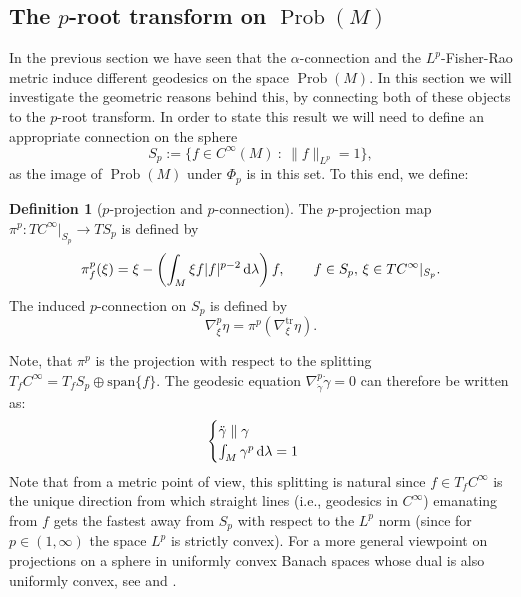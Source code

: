 \documentclass[11pt]{amsart}
\theoremstyle{definition}
\newtheorem{definition}[theorem]{Definition}
\newcommand{\dx}{\lambda}
\newcommand{\Prob}{\operatorname{Prob}(M)}
\newcommand{\ntr}{\nabla^{\text{tr}}}
\newcommand{\ud}{\textup{d}}
\begin{document}
\subsection{The $p$-root transform on $\Prob$}
In the previous section we have seen that the $\alpha$-connection and the $L^p$-Fisher-Rao metric induce different geodesics on the space $\Prob$. In this section we will investigate the geometric reasons behind this, by connecting both of these objects to the $p$-root transform.
In order to state this result we will need to define an appropriate connection on the sphere 
\[
S_p := \{ f\in C^{\infty}(M) ~:~ \|f\|_{L^p} = 1\},
\]
as the image of $\Prob$ under $\Phi_p$ is in this set.
To this end, we define:
\begin{definition}[$p$-projection and $p$-connection]
The $p$-projection map $\pi^p: TC^\infty|_{S_p} \to TS_p$ is defined by
\[
\pi^p_f(\xi) = \xi - \left(\int_M \xi f |f|^{p-2}\,\ud\dx\right)f, \qquad f\in S_p,\, \xi\in TC^\infty|_{S_p}.
\]
The induced $p$-connection on $S_p$ is defined by
\[
\nabla^p_\xi\eta = \pi^p \left( \ntr_\xi\eta\right).
\]
\end{definition}
Note, that $\pi^p$ is the projection with respect to the splitting $T_fC^\infty = T_f S_p \oplus \text{span}\{f\}$.
The geodesic equation $\nabla^p_{\dot\gamma}\dot\gamma = 0$ can therefore be written as:
\begin{equation}\label{eq:geod_nabla_p}
\begin{cases}
    \ddot\gamma \parallel \gamma \\
    \int_M \gamma^p \,\ud\dx = 1
\end{cases}
\end{equation}
Note that from a metric point of view, this splitting is natural since $f\in T_fC^\infty$ is the unique direction from which straight lines (i.e., geodesics in $C^\infty$) emanating from $f$ gets the fastest away from $S_p$ with respect to the $L^p$ norm (since for $p\in (1,\infty)$ the space $L^p$ is strictly convex).
For a more general viewpoint on projections on a sphere in uniformly convex Banach spaces whose dual is also uniformly convex, see \cite{gibilisco1999connections} and \cite[Prop.~2]{gibilisco2020p}.
\end{document}
